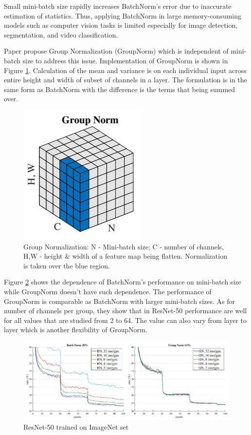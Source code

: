 \documentclass{article}
\begin{document}
Small mini-batch size rapidly increases BatchNorm’s error due to inaccurate estimation of statistics. Thus, applying BatchNorm in large memory-consuming models such as computer vision tasks is limited especially for image detection, segmentation, and video classification. 

Paper \cite{groupnorm} propose Group Normalization (GroupNorm) which is independent of mini-batch size to address this issue. Implementation of GroupNorm is shown in Figure \ref{fig:groupnorm}. Calculation of the mean and variance is on each individual input across entire height and width of subset of channels in a layer. The formulation is in the same form as BatchNorm with the difference is the terms that being summed over. 

\begin{figure}[h]
	\centering
    \includegraphics[scale=0.7]{pics/batchNorm/GroupNorm.jpg}
	\caption{Group Normalization: N - Mini-batch size; C - number of channels, H,W - height \& width of a feature map being flatten. Normalization is taken over the blue region.}
	\label{fig:groupnorm}
\end{figure}

Figure \ref{fig:resnet} shows the dependence of BatchNorm's performance on mini-batch size while GroupNorm doesn't have such dependence. The performance of GroupNorm is comparable as BatchNorm with larger mini-batch sizes. As for number of channels per group, they show that in ResNet-50 performance are well for all values that are studied from 2 to 64. The value can also vary from layer to layer which is another flexibility of GroupNorm.

\begin{figure}[h]
	\centering
    \includegraphics[scale=0.57]{pics/batchNorm/GroupNorm_vs_BatchNorm.jpg}
	\caption{ResNet-50 trained on ImageNet set}
	\label{fig:resnet}
\end{figure}
\end{document}
